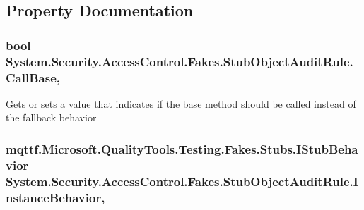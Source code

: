 \subsection{Property Documentation}
\hypertarget{class_system_1_1_security_1_1_access_control_1_1_fakes_1_1_stub_object_audit_rule_a85cce2a5f247a701d13413fbecb932d7}{
\subsubsection[{Call\-Base}]{\setlength{\rightskip}{0pt plus 5cm}bool System.\-Security.\-Access\-Control.\-Fakes.\-Stub\-Object\-Audit\-Rule.\-Call\-Base\hspace{0.3cm}{\ttfamily [get]}, {\ttfamily [set]}}}\label{class_system_1_1_security_1_1_access_control_1_1_fakes_1_1_stub_object_audit_rule_a85cce2a5f247a701d13413fbecb932d7}


Gets or sets a value that indicates if the base method should be called instead of the fallback behavior

\hypertarget{class_system_1_1_security_1_1_access_control_1_1_fakes_1_1_stub_object_audit_rule_a9f6a97991af9eb04d7f78ed9af8e0a93}{
\subsubsection[{Instance\-Behavior}]{\setlength{\rightskip}{0pt plus 5cm}mqttf.\-Microsoft.\-Quality\-Tools.\-Testing.\-Fakes.\-Stubs.\-I\-Stub\-Behavior System.\-Security.\-Access\-Control.\-Fakes.\-Stub\-Object\-Audit\-Rule.\-Instance\-Behavior\hspace{0.3cm}{\ttfamily [get]}, {\ttfamily [set]}}}\label{class_system_1_1_security_1_1_access_control_1_1_fakes_1_1_stub_object_audit_rule_a9f6a97991af9eb04d7f78ed9af8e0a93}


